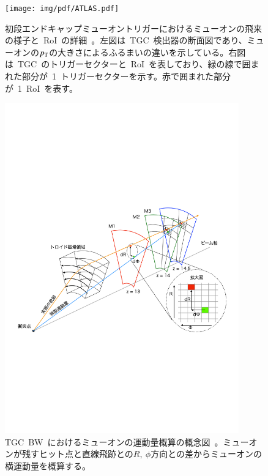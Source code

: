 \begin{figure}[H]
        \centering   
        \texttt{[image: img/pdf/ATLAS.pdf]}
        \caption[初段エンドキャップミューオントリガーにおけるミューオンの飛来の様子と~RoI~の詳細]{初段エンドキャップミューオントリガーにおけるミューオンの飛来の様子と~RoI~の詳細~\cite{TR:01}。左図は~TGC~検出器の断面図であり、ミューオンの$p_{\rm{T}}$の大きさによるふるまいの違いを示している。右図は~TGC~のトリガーセクターと~RoI~を表しており、緑の線で囲まれた部分が~1~トリガーセクターを示す。赤で囲まれた部分が~1~RoI~を表す。}
        \label{fig:tgcpt}
\end{figure}

\begin{figure}[H]
        \centering   
        \includegraphics[width=0.9\textwidth,page=1]{img/pdf/pttgc.pdf}
        \caption[TGC~BW~におけるミューオンの運動量概算の概念図]{TGC~BW~におけるミューオンの運動量概算の概念図~\cite{MT:03}。ミューオンが残すヒット点と直線飛跡との$R,~\phi$方向との差からミューオンの横運動量を概算する。}
        \label{fig:tgcptt}
\end{figure}

